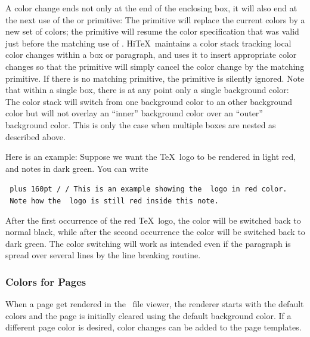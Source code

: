 A color change ends not only at the end of the enclosing box,
it will also end at the next use of the 
or  primitive:
The  primitive will replace the current colors by
a new set of colors; the  primitive will resume
the color specification that was valid just before the matching use
of . Hi\TeX\ maintains a color stack tracking
local color changes within a box or paragraph, and uses it to
insert appropriate color changes so that the  primitive
will simply cancel the color change by the matching  primitive.
If there is no matching  primitive,
the  primitive is silently ignored.
Note that within a single box, there is at any point only a single
background color: The color stack will switch from one background
color to an other background color but will not overlay an ``inner''
background color over an ``outer'' background color.
This is only the case when multiple boxes are nested as described above.

Here is an example:
Suppose we want the \TeX\ logo to be rendered in light red,
and notes in dark green. You can write
\medskip
{\tt\parindent 0pt\rightskip=0pt plus 160pt
\verbatim/\def\redTeX{\HINTcolor{fg{1 0.3 0.3}}\TeX\HINTendcolor}
\def\beginnote{\HINTcolor{fg{0 0.5 0}}}%
\def\endnote{\HINTendcolor}/
\medskip
This is an example showing the \BS\ logo in red color.
\ Note how the \BS\ logo is still red inside
this note.\par}
\medskip

After the first occurrence of the red \TeX\ logo, the color will be switched
back to normal black, while after the second occurrence the color will
be switched back to dark green. The color switching will work as intended
even if the paragraph is spread over several lines by the line breaking routine.

\subsubsection{Colors for Pages}
When a page get rendered in the \HINT\ file viewer,
the renderer starts with the default colors and the page is initially
cleared using the default background color. If a different page
color is desired, color changes can be added to the page templates.

